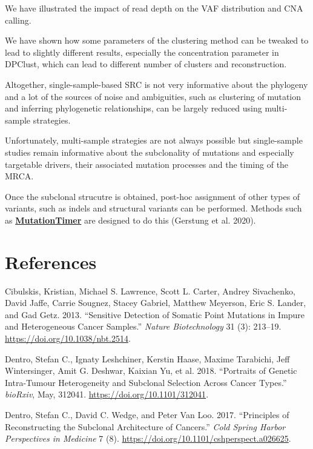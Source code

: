 \documentclass[]{article}
\begin{document}
We have illustrated the impact of read depth on the VAF distribution and
CNA calling.

We have shown how some parameters of the clustering method can be
tweaked to lead to slightly different results, especially the
concentration parameter in DPClust, which can lead to different number
of clusters and reconstruction.

Altogether, single-sample-based SRC is not very informative about the
phylogeny and a lot of the sources of noise and ambiguities, such as
clustering of mutation and inferring phylogenetic relationships, can be
largely reduced using multi-sample strategies.

Unfortunately, multi-sample strategies are not always possible but
single-sample studies remain informative about the subclonality of
mutations and especially targetable drivers, their associated mutation
processes and the timing of the MRCA.

Once the subclonal strucutre is obtained, post-hoc assignment of other
types of variants, such as indels and structural variants can be
performed. Methods such as
\href{https://github.com/gerstung-lab/MutationTimeR}{\textbf{MutationTimer}}
are designed to do this (Gerstung et al. 2020).

\newpage

\hypertarget{references}{%
\section*{References}\label{references}}

\hypertarget{refs}{}
\leavevmode\hypertarget{ref-cibulskis_sensitive_2013}{}%
Cibulskis, Kristian, Michael S. Lawrence, Scott L. Carter, Andrey
Sivachenko, David Jaffe, Carrie Sougnez, Stacey Gabriel, Matthew
Meyerson, Eric S. Lander, and Gad Getz. 2013. ``Sensitive Detection of
Somatic Point Mutations in Impure and Heterogeneous Cancer Samples.''
\emph{Nature Biotechnology} 31 (3): 213--19.
\url{https://doi.org/10.1038/nbt.2514}.

\leavevmode\hypertarget{ref-dentro_portraits_2018}{}%
Dentro, Stefan C., Ignaty Leshchiner, Kerstin Haase, Maxime Tarabichi,
Jeff Wintersinger, Amit G. Deshwar, Kaixian Yu, et al. 2018. ``Portraits
of Genetic Intra-Tumour Heterogeneity and Subclonal Selection Across
Cancer Types.'' \emph{bioRxiv}, May, 312041.
\url{https://doi.org/10.1101/312041}.

\leavevmode\hypertarget{ref-dentro_principles_2017}{}%
Dentro, Stefan C., David C. Wedge, and Peter Van Loo. 2017. ``Principles
of Reconstructing the Subclonal Architecture of Cancers.'' \emph{Cold
Spring Harbor Perspectives in Medicine} 7 (8).
\url{https://doi.org/10.1101/cshperspect.a026625}.
\end{document}

